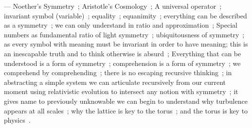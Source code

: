 \documentclass[11pt]{article}
\begin{document}
\label{def:symmetry} --- Noether's Symmetry~\cite{noether_theorem_1918}; Aristotle's Cosmology~\cite{aristotle_on_the_heavens_1939}; A universal operator~\cite{plato_complete_works_1997}; invariant symbol (variable)~\cite{klein_erlangen_program_1872}; equality~\cite{recorde_equals_sign_1557}; equanimity~\cite{vyasa_bhagavad_gita_500bce}; everything can be described as a symmetry~\cite{weyl_symmetry_1952}; we can only understand in ratio and approximation~\cite{protagoras_man_measure_401bce}; Special numbers as fundamental ratio of light symmetry~\cite{kepler_harmonices_mundi_1618}; ubiquitousness of symmetry~\cite{hermes_trismegistus_emerald_tablet_800bce}; as every symbol with meaning must be invariant in order to have meaning; this is an inescapable truth and to think otherwise is absurd~\cite{frege_concept_object_1892}; Everything that can be understood is a form of symmetry~\cite{marcus_aurelius_meditations_180}; comprehension is a form of symmetry~\cite{pizlo_symmetry_perception_2021}; we comprehend by comprehending~\cite{vico_de_antiquissima_1710}; there is no escaping recursive thinking~\cite{epimenides_paradox_600bce}; in abstracting a simple system we can articulate recursively from our current moment using relativistic evolution to intersect any notion with symmetry~\cite{ockham_summa_logicae_1323}; it gives name to previously unknowable we can begin to understand why turbulence appears at all scales~\cite{confucius_analects_500bce}; why the lattice is key to the torus~\cite{sun_brillouin_klein_bottle_2022}; and the torus is key to physics~\cite{thomson_vortex_atoms_1867}.  
\end{document}
